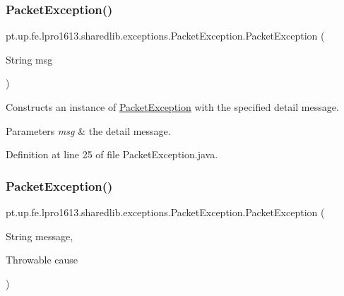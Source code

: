\subsubsection{\texorpdfstring{Packet\+Exception()}{PacketException()}\hspace{0.1cm}{\footnotesize\ttfamily [2/4]}}
{\footnotesize\ttfamily pt.\+up.\+fe.\+lpro1613.\+sharedlib.\+exceptions.\+Packet\+Exception.\+Packet\+Exception (\begin{DoxyParamCaption}\item[{String}]{msg }\end{DoxyParamCaption})}

Constructs an instance of {\ttfamily \hyperlink{classpt_1_1up_1_1fe_1_1lpro1613_1_1sharedlib_1_1exceptions_1_1_packet_exception}{Packet\+Exception}} with the specified detail message.


\begin{DoxyParams}{Parameters}
{\em msg} & the detail message. \\
\hline
\end{DoxyParams}


Definition at line 25 of file Packet\+Exception.\+java.

\hypertarget{classpt_1_1up_1_1fe_1_1lpro1613_1_1sharedlib_1_1exceptions_1_1_packet_exception_aabf4cbacec06473f617c9b8d23829640}{}\label{classpt_1_1up_1_1fe_1_1lpro1613_1_1sharedlib_1_1exceptions_1_1_packet_exception_aabf4cbacec06473f617c9b8d23829640} 
\subsubsection{\texorpdfstring{Packet\+Exception()}{PacketException()}\hspace{0.1cm}{\footnotesize\ttfamily [3/4]}}
{\footnotesize\ttfamily pt.\+up.\+fe.\+lpro1613.\+sharedlib.\+exceptions.\+Packet\+Exception.\+Packet\+Exception (\begin{DoxyParamCaption}\item[{String}]{message,  }\item[{Throwable}]{cause }\end{DoxyParamCaption})}

